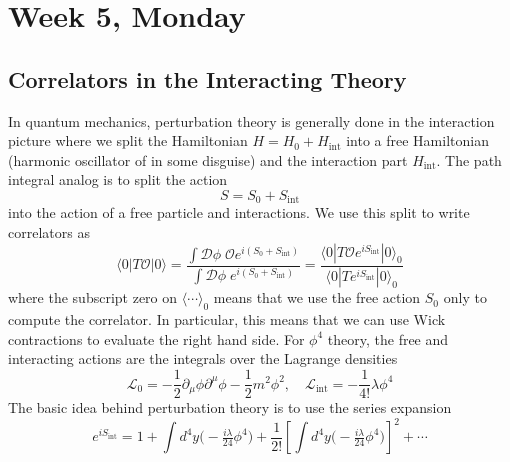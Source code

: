 \documentclass[12pt]{article}
\begin{document}
\newpage





\section{Week 5, Monday}


\subsection{Correlators in the Interacting Theory}

In quantum mechanics, perturbation theory is generally done in the
interaction picture where we split the Hamiltonian $H=H_0 +
H_\text{int}$ into a free Hamiltonian (harmonic oscillator of in some
disguise) and the interaction part $H_\text{int}$. The path integral
analog is to split the action
\begin{equation}
  S = S_0 + S_\text{int}
\end{equation}
into the action of a free particle and interactions. We use this split
to write correlators as
\begin{equation}
  \label{eq:corrSint}
  \langle 0 | T\mathcal{O} |0\rangle =
  \frac{
    \int \mathcal{D}\phi \; \mathcal{O} e^{i(S_0+S_\text{int})}
  }{ 
    \int \mathcal{D}\phi \; e^{i(S_0+S_\text{int})}
  }
  = 
  \frac{
    \langle0|T \mathcal{O} e^{iS_\text{int}} |0\rangle_0
  }{
    \langle0|T e^{iS_\text{int}} |0\rangle_0
  }
\end{equation}
where the subscript zero on $\langle \cdots \rangle_0$ means that we
use the free action $S_0$ only to compute the correlator. In
particular, this means that we can use Wick contractions to evaluate
the right hand side. For $\phi^4$ theory, the free and interacting
actions are the integrals over the Lagrange densities
\begin{equation}
  \mathcal{L}_0 = -\frac{1}{2} \partial_\mu \phi \partial^\mu \phi
  - \frac{1}{2} m^2 \phi^2
  , \quad
  \mathcal{L}_\text{int} = 
  - \frac{1}{4!} \lambda \phi^4
\end{equation}
The basic idea behind perturbation theory is to use the series
expansion
\begin{equation}
  e^{i S_\text{int}} = 
  1 + 
  \int d^4y \big(-\tfrac{i\lambda}{24} \phi^4 \big) + 
  \frac{1}{2!}
  \left[\int d^4y \big(-\tfrac{i\lambda}{24} \phi^4 \big)\right]^2
  + \cdots
\end{equation}
\end{document}
